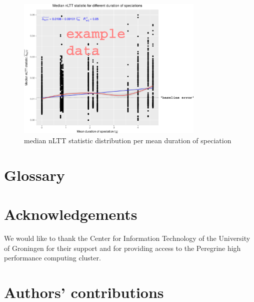 \documentclass{article}
\begin{document}
\begin{figure}[!htbp]
  \includegraphics[width=0.8\textwidth]{nllt_stats_per_mean_dur_spec.png}
  \caption{
    median nLTT statistic distribution per mean duration of speciation
  }
\end{figure}

\section{Glossary}


\section{Acknowledgements}

We would like to thank the Center for Information Technology of the University of Groningen for their support
and for providing access to the Peregrine high performance computing cluster.

\section{Authors' contributions}
\end{document}
